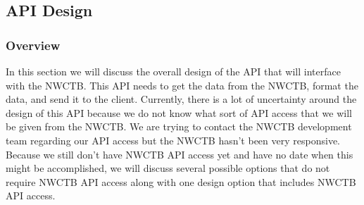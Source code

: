 \documentclass[onecolumn, draftclsnofoot,10pt, compsoc]{article}
\begin{document}
	\subsection{API Design}
		\subsubsection{Overview}
			In this section we will discuss the overall design of the API that will interface with the NWCTB. This API needs to get the data from the NWCTB, format the data, and send it to the client. Currently, there is a lot of uncertainty around the design of this API because we do not know what sort of API access that we will be given from the NWCTB. We are trying to contact the NWCTB development team regarding our API access but the NWCTB hasn't been very responsive. Because we still don't have NWCTB API access yet and have no date when this might be accomplished, we will discuss several possible options that do not require NWCTB API access along with one design option that includes NWCTB API access.\\
\end{document}
